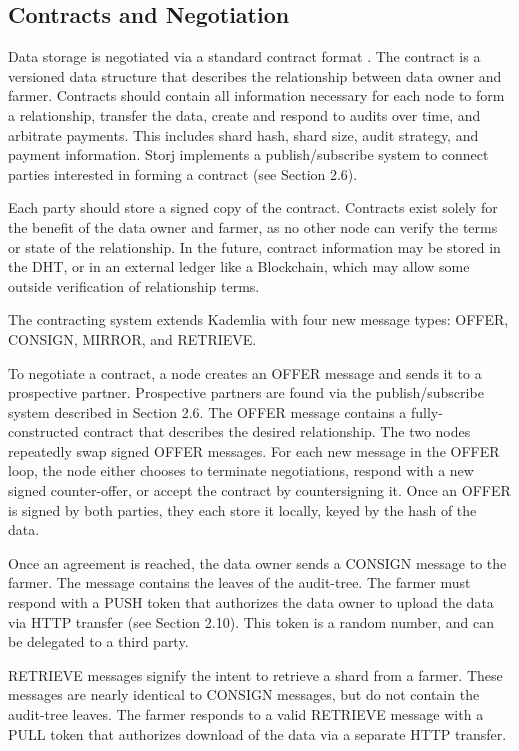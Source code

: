 \documentclass[a4paper,10pt]{article}
\begin{document}
\subsection{Contracts and Negotiation}
Data storage is negotiated via a standard contract format \cite{7}. The contract
is a versioned data structure that describes the relationship between data owner
and farmer. Contracts should contain all information necessary for each node to
form a relationship, transfer the data, create and respond to audits over time,
and arbitrate payments. This includes shard hash, shard size, audit strategy,
and payment information. Storj implements a publish/subscribe system to connect
parties interested in forming a contract (see Section 2.6).

Each party should store a signed copy of the contract. Contracts exist solely
for the benefit of the data owner and farmer, as no other node can verify the
terms or state of the relationship. In the future, contract information may be
stored in the DHT, or in an external ledger like a Blockchain, which may allow
some outside verification of relationship terms.

The contracting system extends Kademlia with four new message types: OFFER,
CONSIGN, MIRROR, and RETRIEVE.

To negotiate a contract, a node creates an OFFER message and sends it to a
prospective partner. Prospective partners are found via the publish/subscribe
system described in Section 2.6. The OFFER message contains a fully-constructed
contract that describes the desired relationship. The two nodes repeatedly swap
signed OFFER messages. For each new message in the OFFER loop, the node either
chooses to terminate negotiations, respond with a new signed counter-offer, or
accept the contract by countersigning it. Once an OFFER is signed by both
parties, they each store it locally, keyed by the hash of the data.

Once an agreement is reached, the data owner sends a CONSIGN message to the
farmer. The message contains the leaves of the audit-tree. The farmer must
respond with a PUSH token that authorizes the data owner to upload the data via
HTTP transfer (see Section 2.10). This token is a random number, and can be
delegated to a third party.

RETRIEVE messages signify the intent to retrieve a shard from a farmer. These
messages are nearly identical to CONSIGN messages, but do not contain the
audit-tree leaves. The farmer responds to a valid RETRIEVE message with a PULL
token that authorizes download of the data via a separate HTTP transfer.
\end{document}
